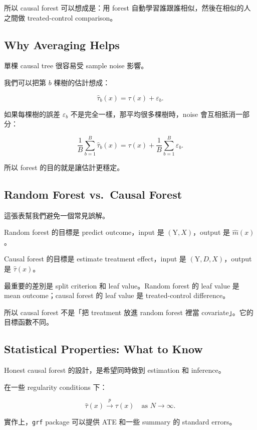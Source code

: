 \documentclass[
  chinese,
  11pt,
]{article}
\begin{document}
所以 causal forest 可以想成是：用 forest
自動學習誰跟誰相似，然後在相似的人之間做 treated-control comparison。

\subsection{Why Averaging Helps}\label{why-averaging-helps}

單棵 causal tree 很容易受 sample noise 影響。

我們可以把第 \(b\) 棵樹的估計想成：

\[
\hat{\tau}_b(x)=\tau(x)+\varepsilon_b.
\]

如果每棵樹的誤差 \(\varepsilon_b\) 不是完全一樣，那平均很多棵樹時，noise
會互相抵消一部分：

\[
\frac{1}{B}\sum_{b=1}^B\hat{\tau}_b(x)
=
\tau(x)+\frac{1}{B}\sum_{b=1}^B\varepsilon_b.
\]

所以 forest 的目的就是讓估計更穩定。

\subsection{Random Forest vs.~Causal
Forest}\label{random-forest-vs.-causal-forest}

這張表幫我們避免一個常見誤解。

Random forest 的目標是 predict outcome，input 是
\((\mathrm{Y},X)\)，output 是 \(\hat{m}(x)\)。

Causal forest 的目標是 estimate treatment effect，input 是
\((\mathrm{Y},D,X)\)，output 是 \(\hat{\tau}(x)\)。

最重要的差別是 split criterion 和 leaf value。Random forest 的 leaf
value 是 mean outcome；causal forest 的 leaf value 是 treated-control
difference。

所以 causal forest 不是「把 treatment 放進 random forest 裡當
covariate」。它的目標函數不同。

\subsection{Statistical Properties: What to
Know}\label{statistical-properties-what-to-know}

Honest causal forest 的設計，是希望同時做到 estimation 和 inference。

在一些 regularity conditions 下：

\[
\hat{\tau}(x)\xrightarrow{p}\tau(x)
\quad \text{as } N\to\infty.
\]

實作上，\texttt{grf} package 可以提供 ATE 和一些 summary 的 standard
errors。
\end{document}
